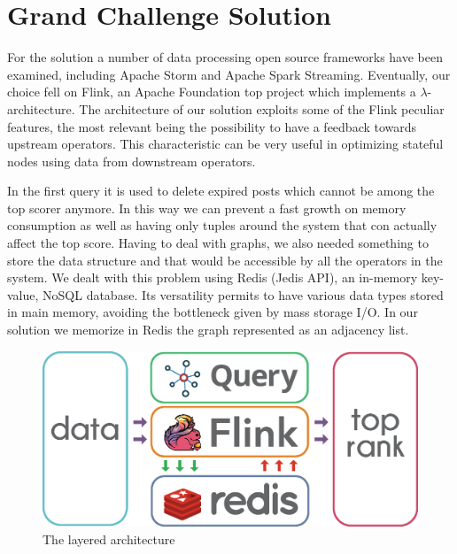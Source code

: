 \section{Grand Challenge Solution}
\label{sec:solution}

For the solution a number of data processing open source frameworks have been examined, including Apache Storm and Apache Spark Streaming.
Eventually, our choice fell on Flink, an Apache Foundation top project which implements a $\lambda$-architecture. The architecture of our solution exploits some of the Flink peculiar features, the most relevant being the possibility to have a feedback towards upstream operators. This characteristic can be very useful in optimizing stateful nodes using data from downstream operators. 

In the first query it is used to delete expired posts which cannot be among the top scorer anymore. In this way we can prevent a fast growth on memory consumption as well as having only tuples around the system that con actually affect the top score. Having to deal with graphs, we also needed something to store the data structure and that would be accessible by all the operators in the system. We dealt with this problem using Redis (Jedis API), an in-memory key-value, NoSQL database. Its versatility permits to have various data types stored in main memory, avoiding the bottleneck given by mass storage I/O. In our solution we memorize in Redis the graph represented as an adjacency list.

\begin{figure}
	\centering
	\includegraphics[width=\columnwidth]{fig/sostream-layered-architecture}
	\caption{The layered architecture}
	\label{fig:sostream-layered-architecture}
\end{figure}